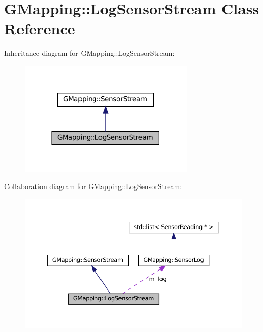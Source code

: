 \hypertarget{classGMapping_1_1LogSensorStream}{}\section{G\+Mapping\+:\+:Log\+Sensor\+Stream Class Reference}
\label{classGMapping_1_1LogSensorStream}


Inheritance diagram for G\+Mapping\+:\+:Log\+Sensor\+Stream\+:
\nopagebreak
\begin{figure}[H]
\begin{center}
\leavevmode
\includegraphics[width=237pt]{classGMapping_1_1LogSensorStream__inherit__graph}
\end{center}
\end{figure}


Collaboration diagram for G\+Mapping\+:\+:Log\+Sensor\+Stream\+:
\nopagebreak
\begin{figure}[H]
\begin{center}
\leavevmode
\includegraphics[width=350pt]{classGMapping_1_1LogSensorStream__coll__graph}
\end{center}
\end{figure}
